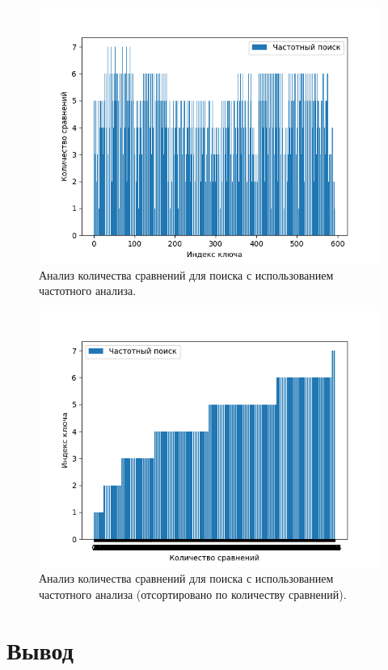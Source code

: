 \documentclass[12pt]{report}
\begin{document}
\begin{figure}[H]
	\centering
	\includegraphics[scale=0.55]{clust_search.png}
	\caption{Анализ количества сравнений для поиска с использованием частотного анализа.}
	\label{fig:mpr}
\end{figure}

\begin{figure}[H]
	\centering
	\includegraphics[scale=0.55]{clust_search_sorted.png}
	\caption{Анализ количества сравнений для поиска с использованием частотного анализа (отсортировано по количеству сравнений).}
	\label{fig:mpr}
\end{figure}

\section*{Вывод}
\end{document}
